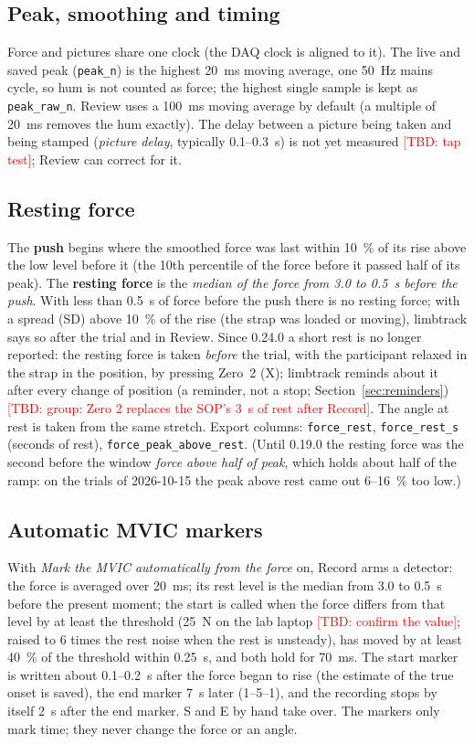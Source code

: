 \documentclass[a4paper,10pt]{article}
\newcommand{\lt}{\textsf{limbtrack}}
\newcommand{\code}[1]{\texttt{#1}}
\newcommand{\tbd}[1]{\textcolor{red}{[TBD: #1]}}
\begin{document}
\subsection{Peak, smoothing and timing}
Force and pictures share one clock (the DAQ clock is aligned to it). The live and saved peak (\code{peak\_n}) is the highest 20~ms moving
average, one 50~Hz mains cycle, so hum is not counted as force; the highest single sample is kept as \code{peak\_raw\_n}. Review uses a
100~ms moving average by default (a multiple of 20~ms removes the hum exactly). The delay between a picture being taken and being stamped
(\emph{picture delay}, typically 0.1--0.3~s) is not yet measured \tbd{tap test}; Review can correct for it.

\subsection{Resting force}\label{sec:rest}
The \textbf{push} begins where the smoothed force was last within 10~\% of its rise above the low level before it (the 10th percentile
of the force before it passed half of its peak). The \textbf{resting force} is the \emph{median of the force from 3.0 to 0.5~s before the
push}. With less than 0.5~s of force before the push there is no resting force; with a spread (SD) above 10~\% of the rise (the strap was
loaded or moving), \lt{} says so after the trial and in Review. Since 0.24.0 a short rest is no longer reported: the resting force is taken
\emph{before} the trial, with the participant relaxed in the strap in the position, by pressing Zero~2 (X); \lt{} reminds about it after every
change of position (a reminder, not a stop; Section~\ref{sec:reminders}) \tbd{group: Zero 2 replaces the SOP's 3~s of rest after Record}.
The angle at rest is taken from the same stretch. Export columns: \code{force\_rest}, \code{force\_rest\_s} (seconds
of rest), \code{force\_peak\_above\_rest}. (Until 0.19.0 the resting force was the second before the window \emph{force above half of
peak}, which holds about half of the ramp: on the trials of 2026-10-15 the peak above rest came out 6--16~\% too low.)

\subsection{Automatic MVIC markers}
With \emph{Mark the MVIC automatically from the force} on, Record arms a detector: the force is averaged over 20~ms; its rest level is the
median from 3.0 to 0.5~s before the present moment; the start is called when the force differs from that level by at least the threshold
(25~N on the lab laptop \tbd{confirm the value}; raised to 6 times the rest noise when the rest is unsteady), has moved by at least 40~\% of
the threshold within 0.25~s, and both hold for 70~ms. The start marker is written about 0.1--0.2~s after the force began to rise (the
estimate of the true onset is saved), the end marker 7~s later (1--5--1), and the recording stops by itself 2~s after the end marker. S and
E by hand take over. The markers only mark time; they never change the force or an angle.
\end{document}
